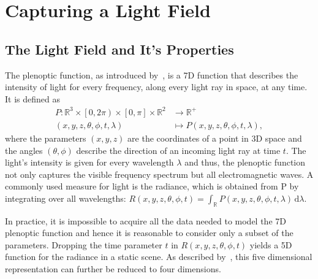 \chapter{Capturing a Light Field}

\section{The Light Field and It's Properties}

The plenoptic function, as introduced by~\cite{AdelsonBergen}, is a 7D function that describes the intensity of light for every frequency, along every light ray in space, at any time. 
It is defined as
\begin{align*}
	P \colon \mathbb{R}^3 \times \left[0, 2 \pi \right) \times \left[ 0, \pi \right] \times \mathbb{R}^2 & \to \mathbb{R}^+ \\
	\left(x, y, z, \theta, \phi, t, \lambda \right) & \mapsto P\left(x, y, z, \theta, \phi, t, \lambda \right), 
\end{align*}
where the parameters $\left(x, y, z\right)$ are the coordinates of a point in 3D space and the angles $\left(\theta, \phi \right)$ describe the direction of an incoming light ray at time $t$. 
The light's intensity is given for every wavelength $\lambda$ and thus, the plenoptic function not only captures the visible frequency spectrum but all electromagnetic waves. 
A commonly used measure for light is the radiance, which is obtained from P by integrating over all wavelengths: 
$R\left(x, y, z, \theta, \phi, t\right) = \int_{\mathbb{R}} \! P\left(x, y, z, \theta, \phi, t, \lambda \right) \, \mathrm{d} \lambda$.

In practice, it is impossible to acquire all the data needed to model the 7D plenoptic function and hence it is reasonable to consider only a subset of the parameters. 
Dropping the time parameter $t$ in $R\left( x, y, z, \theta, \phi, t \right) $ yields a 5D function for the radiance in a static scene. 
As described by~\cite{LightFieldRendering}, this five dimensional representation can further be reduced to four dimensions.

%	
%	
%		
%	
%		
%		
%	
